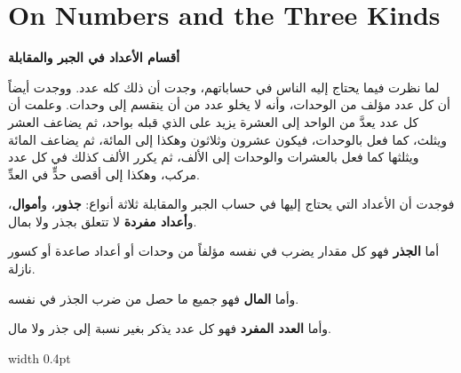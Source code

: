 \documentclass[11pt,a4paper,openany,oneside]{book}
\begin{document}
\newpage

\chapter{On Numbers and the Three Kinds}
\label{ch:intro}

\noindent\begin{minipage}[t]{0.48\textwidth}
\raggedleft

\begin{Arabic}
\textbf{أقسام الأعداد في الجبر والمقابلة}

لما نظرت فيما يحتاج إليه الناس في حساباتهم، وجدت أن ذلك كله عدد. ووجدت أيضاً أن كل عدد مؤلف من الوحدات، وأنه لا يخلو عدد من أن ينقسم إلى وحدات. وعلمت أن كل عدد يعدَّ من الواحد إلى العشرة يزيد على الذي قبله بواحد، ثم يضاعف العشر ويثلث، كما فعل بالوحدات، فيكون عشرون وثلاثون وهكذا إلى المائة، ثم يضاعف المائة ويثلثها كما فعل بالعشرات والوحدات إلى الألف، ثم يكرر الألف كذلك في كل عدد مركب، وهكذا إلى أقصى حدٍّ في العدِّ.

فوجدت أن الأعداد التي يحتاج إليها في حساب الجبر والمقابلة ثلاثة أنواع: \textbf{جذور}، و\textbf{أموال}، و\textbf{أعداد مفردة} لا تتعلق بجذر ولا بمال.

أما \textbf{الجذر} فهو كل مقدار يضرب في نفسه مؤلفاً من وحدات أو أعداد صاعدة أو كسور نازلة.

وأما \textbf{المال} فهو جميع ما حصل من ضرب الجذر في نفسه.

وأما \textbf{العدد المفرد} فهو كل عدد يذكر بغير نسبة إلى جذر ولا مال.
\end{Arabic}

\end{minipage}%
\hfill\vrule width 0.4pt\hfill
\end{document}
